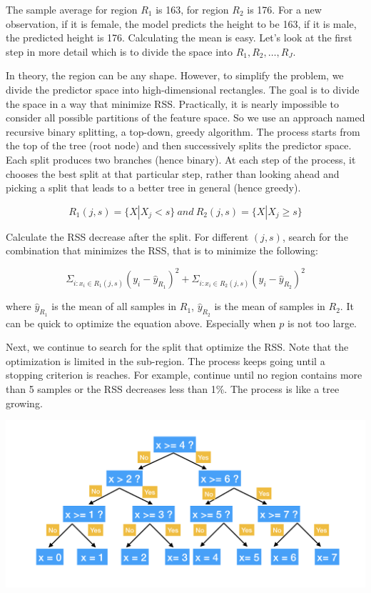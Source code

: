 \documentclass[
  12pt,
]{krantz}
\begin{document}
The sample average for region \(R_1\) is 163, for region \(R_2\) is 176. For a new observation, if it is female, the model predicts the height to be 163, if it is male, the predicted height is 176. Calculating the mean is easy. Let's look at the first step in more detail which is to divide the space into \(R_1, R_2, \dots, R_J\).

In theory, the region can be any shape. However, to simplify the problem, we divide the predictor space into high-dimensional rectangles. The goal is to divide the space in a way that minimize RSS. Practically, it is nearly impossible to consider all possible partitions of the feature space. So we use an approach named recursive binary splitting, a top-down, greedy algorithm. The process starts from the top of the tree (root node) and then successively splits the predictor space. Each split produces two branches (hence binary). At each step of the process, it chooses the best split at that particular step, rather than looking ahead and picking a split that leads to a better tree in general (hence greedy).

\[R_{1}(j, s)=\{X|X_j<s\}\ and\ R_{2}(j, s)=\{X|X_j\geq s\}\]

Calculate the RSS decrease after the split. For different \((j,s)\), search for the combination that minimizes the RSS, that is to minimize the following:

\[\Sigma_{i:x_i\in R_1(j,s)}(y_i-\hat{y}_{R_{1}})^2+\Sigma_{i:x_i\in R_2(j,s)}(y_i-\hat{y}_{R_{2}})^2\]

where \(\hat{y}_{R_1}\) is the mean of all samples in \(R_1\), \(\hat{y}_{R_2}\) is the mean of samples in \(R_2\). It can be quick to optimize the equation above. Especially when \(p\) is not too large.

Next, we continue to search for the split that optimize the RSS. Note that the optimization is limited in the sub-region. The process keeps going until a stopping criterion is reaches. For example, continue until no region contains more than 5 samples or the RSS decreases less than 1\%. The process is like a tree growing.

\includegraphics{images/BinaryTree.png}
\end{document}
